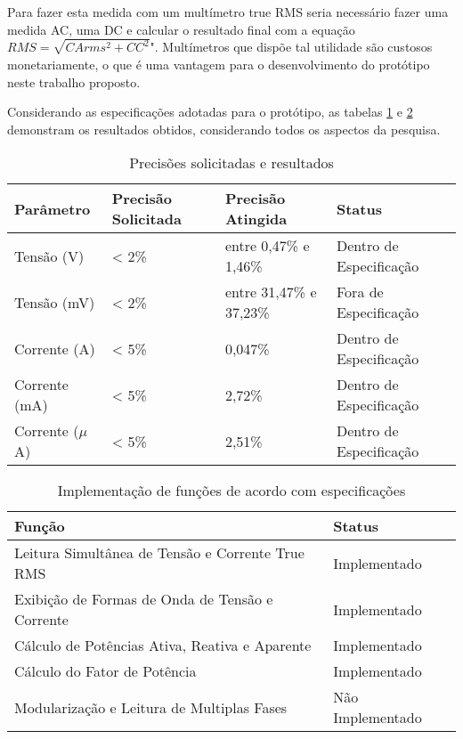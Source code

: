 Para fazer esta medida com um multímetro true RMS seria necessário fazer uma medida AC, uma DC e calcular o resultado final com a equação $RMS=\sqrt{CArms^2+CC^2}$". Multímetros que dispõe tal utilidade são custosos monetariamente, o que é uma vantagem para o desenvolvimento do protótipo neste trabalho proposto. 

Considerando as especificações adotadas para o protótipo, as tabelas \ref{tab:resultados-precis} e \ref{tab:resultados-func} demonstram os resultados obtidos, considerando todos os aspectos da pesquisa.

\begin{table}[!h]
    \centering
    \caption{Precisões solicitadas e resultados}
    \label{tab:resultados-precis}
    \begin{tabular}{ l l l l }
        \hline
        \textbf{Parâmetro} & \textbf{Precisão Solicitada} & \textbf{Precisão Atingida} & \textbf{Status}         \\ \hline
        Tensão (V)         & < 2\%                        & entre 0,47\% e 1,46\%      & Dentro de Especificação \\ 
        Tensão (mV)        & < 2\%                        & entre 31,47\% e 37,23\%    & Fora de Especificação   \\ 
        Corrente (A)       & < 5\%                        & 0,047\%                    & Dentro de Especificação \\ 
        Corrente (mA)      & < 5\%                        & 2,72\%                     & Dentro de Especificação  \\ 
        Corrente ($\mu$A)  & < 5\%                        & 2,51\%                     & Dentro de Especificação   \\ \hline
    \end{tabular}
    \fonte{}
\end{table}

\begin{table}[!h]
    \centering
    \caption{Implementação de funções de acordo com especificações}
    \label{tab:resultados-func}
    \begin{tabular}{ l l }
        \hline
        \textbf{Função}                                  & \textbf{Status} \\ \hline
        Leitura Simultânea de Tensão e Corrente True RMS & Implementado  \\ 
        Exibição de Formas de Onda de Tensão e Corrente  & Implementado  \\ 
        Cálculo de Potências Ativa, Reativa e Aparente   & Implementado  \\ 
        Cálculo do Fator de Potência                     & Implementado  \\ \hline
        Modularização e Leitura de Multiplas Fases       & Não Implementado  \\ \hline
    \end{tabular}
    \fonte{}
\end{table}


